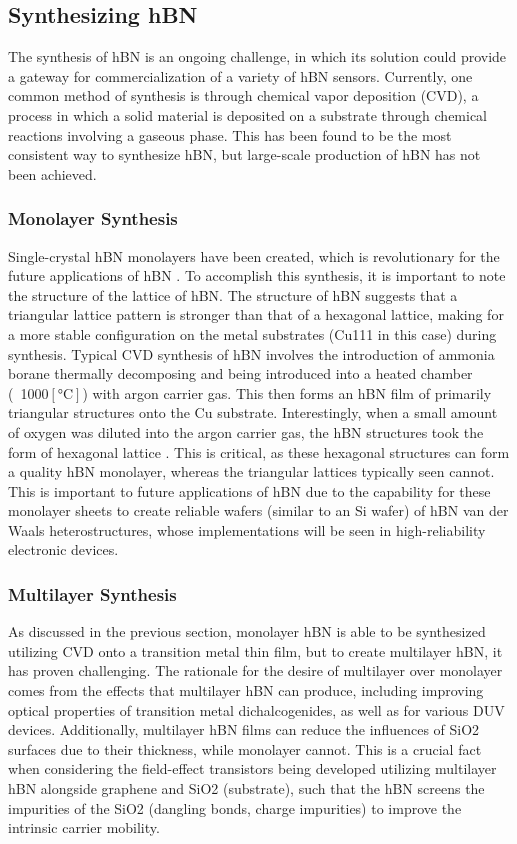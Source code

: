 \documentclass[conference]{IEEEtran}
\begin{document}
\subsection{Synthesizing hBN}

The synthesis of hBN is an ongoing challenge, in which its solution could provide a gateway for commercialization of a variety of hBN sensors. Currently, one common method of synthesis is through chemical vapor deposition (CVD), a process in which a solid material is deposited on a substrate through chemical reactions involving a gaseous phase. This has been found to be the most consistent way to synthesize hBN, but large-scale production of hBN has not been achieved.

\subsubsection{Monolayer Synthesis}

Single-crystal hBN monolayers have been created, which is revolutionary for the future applications of hBN \cite{b10}. To accomplish this synthesis, it is important to note the structure of the lattice of hBN. The structure of hBN suggests that a triangular lattice pattern is stronger than that of a hexagonal lattice, making for a more stable configuration on the metal substrates (Cu111 in this case) during synthesis. Typical CVD synthesis of hBN involves the introduction of ammonia borane thermally decomposing and being introduced into a heated chamber (~1000$[\si{\celsius}]$) with argon carrier gas. This then forms an hBN film of primarily triangular structures onto the Cu substrate. Interestingly, when a small amount of oxygen was diluted into the argon carrier gas, the hBN structures took the form of hexagonal lattice \cite{b10}. This is critical, as these hexagonal structures can form a quality hBN monolayer, whereas the triangular lattices typically seen cannot. This is important to future applications of hBN due to the capability for these monolayer sheets to create reliable wafers (similar to an Si wafer) of hBN van der Waals heterostructures, whose implementations will be seen in high-reliability electronic devices.
 
\subsubsection{Multilayer Synthesis}

As discussed in the previous section, monolayer hBN is able to be synthesized utilizing CVD onto a transition metal thin film, but to create multilayer hBN, it has proven challenging. The rationale for the desire of multilayer over monolayer comes from the effects that multilayer hBN can produce, including improving optical properties of transition metal dichalcogenides, as well as for various DUV devices. Additionally, multilayer hBN films can reduce the influences of SiO2 surfaces due to their thickness, while monolayer cannot. This is a crucial fact when considering the field-effect transistors being developed utilizing multilayer hBN alongside graphene and SiO2 (substrate), such that the hBN screens the impurities of the SiO2 (dangling bonds, charge impurities) to improve the intrinsic carrier mobility.
\end{document}
